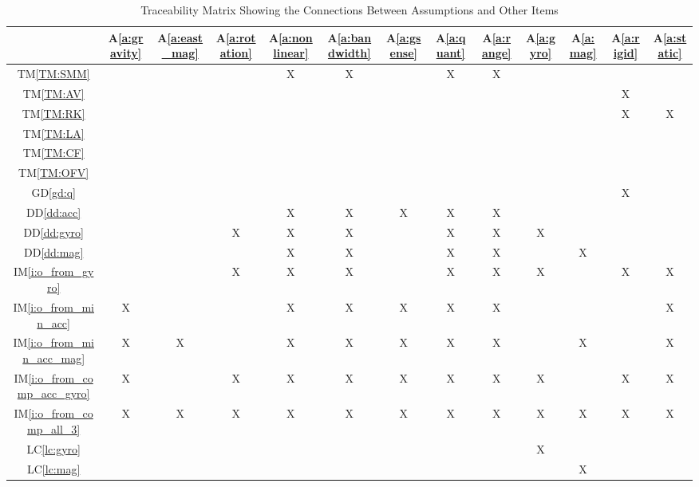 \documentclass[12pt]{article}
\newcounter{defnum} %
\newcommand{\dref}[1]{GD\ref{#1}} \newcounter{datadefnum} %
\newcommand{\ddref}[1]{DD\ref{#1}} \newcounter{theorynum} %
\newcommand{\tref}[1]{TM\ref{#1}} \newcounter{tablenum} %
\newcommand{\aref}[1]{A\ref{#1}} \newcounter{goalnum} %
\newcommand{\iref}[1]{IM\ref{#1}} \newcounter{reqnum} %
\newcommand{\lcref}[1]{LC\ref{#1}}
\begin{document}
\begin{table}[h!]
\centering
\begin{tabular}{|c|c|c|c|c|c|c|c|c|c|c|c|c|}
\hline
	& \aref{a:gravity}
	&\aref{a:east_mag}&\aref{a:rotation}&\aref{a:nonlinear}&\aref{a:bandwidth}&\aref{a:gsense}&\aref{a:quant}&\aref{a:range}&\aref{a:gyro}&\aref{a:mag}
	&\aref{a:rigid}& \aref{a:static} \\
\hline
\tref{TM:SMM}               & & & & X& X& & X& X& & & & \\ \hline
\tref{TM:AV}                & & & & & & & & & & & X& \\ \hline
\tref{TM:RK}                & & & & & & & & & & & X&X \\ \hline
\tref{TM:LA}                & & & & & & & & & & & & \\ \hline
\tref{TM:CF}                & & & & & & & & & & & & \\ \hline
\tref{TM:OFV}               & & & & & & & & & & & & \\ \hline
\dref{gd:q}                 & & & & & & & & & & & X& \\ \hline
\ddref{dd:acc}              & & & & X& X& X& X& X& & & & \\ \hline
\ddref{dd:gyro}             & & & X& X& X& & X& X& X& & & \\ \hline
\ddref{dd:mag}              & & & & X& X& & X& X& & X& & \\ \hline
\iref{i:o_from_gyro}        & & & X& X& X& & X& X& X& & X&X \\ \hline
\iref{i:o_from_min_acc}     & X& & & X& X& X& X& X& & & &X \\ \hline
\iref{i:o_from_min_acc_mag} & X& X& & X& X& X& X& X& & X& &X \\ \hline
\iref{i:o_from_comp_acc_gyro}&X& & X& X& X& X& X& X& X& & X&X \\ \hline
\iref{i:o_from_comp_all_3}  & X& X& X& X& X& X& X& X& X& X& X&X  \\ \hline
\lcref{lc:gyro}             & & & & & & & & & X& & & \\ \hline
\lcref{lc:mag}              & & & & & & & & & & X& & \\ \hline
\end{tabular}
\caption{Traceability Matrix Showing the Connections Between Assumptions and Other Items}
\label{Table:A_trace}
\end{table}
\end{document}
